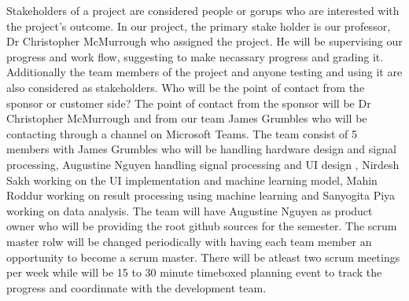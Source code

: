 Stakeholders of a project are considered people or gorups who are interested with the project's outcome. In our project, the primary stake holder is our professor, Dr Christopher McMurrough who assigned the project. He will be supervising our progress and work flow, suggesting to make necassary progress and grading it. Additionally the team members of the project and anyone testing and using it are also considered as stakeholders. Who will be the point of contact from the sponsor or customer side? The point of contact from the sponsor will be Dr Christopher McMurrough and from our team James Grumbles who will be contacting through a channel on Microsoft Teams. The team consist of 5 members with James Grumbles who will be handling hardware design and signal processing, Augustine Nguyen handling signal processing and UI design , Nirdesh Sakh working on the UI implementation and machine learning model, Mahin Roddur working on result processing using machine learning and Sanyogita Piya working on data analysis. The team will have Augustine Nguyen as product owner who will be providing the root github sources for the semester. The scrum master rolw will be changed periodically with having each team member an opportunity to become a scrum master. There will be atleast two scrum meetings per week while will be 15 to 30 minute timeboxed planning event to track the progress and coordinnate with the development team.  
